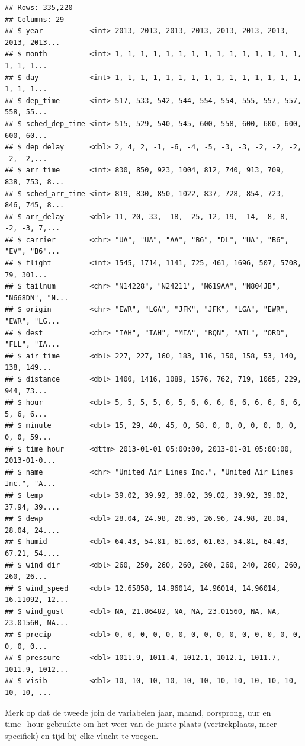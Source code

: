 \documentclass[]{tufte-book}
\begin{document}
\begin{verbatim}
## Rows: 335,220
## Columns: 29
## $ year           <int> 2013, 2013, 2013, 2013, 2013, 2013, 2013, 2013, 2013...
## $ month          <int> 1, 1, 1, 1, 1, 1, 1, 1, 1, 1, 1, 1, 1, 1, 1, 1, 1, 1...
## $ day            <int> 1, 1, 1, 1, 1, 1, 1, 1, 1, 1, 1, 1, 1, 1, 1, 1, 1, 1...
## $ dep_time       <int> 517, 533, 542, 544, 554, 554, 555, 557, 557, 558, 55...
## $ sched_dep_time <int> 515, 529, 540, 545, 600, 558, 600, 600, 600, 600, 60...
## $ dep_delay      <dbl> 2, 4, 2, -1, -6, -4, -5, -3, -3, -2, -2, -2, -2, -2,...
## $ arr_time       <int> 830, 850, 923, 1004, 812, 740, 913, 709, 838, 753, 8...
## $ sched_arr_time <int> 819, 830, 850, 1022, 837, 728, 854, 723, 846, 745, 8...
## $ arr_delay      <dbl> 11, 20, 33, -18, -25, 12, 19, -14, -8, 8, -2, -3, 7,...
## $ carrier        <chr> "UA", "UA", "AA", "B6", "DL", "UA", "B6", "EV", "B6"...
## $ flight         <int> 1545, 1714, 1141, 725, 461, 1696, 507, 5708, 79, 301...
## $ tailnum        <chr> "N14228", "N24211", "N619AA", "N804JB", "N668DN", "N...
## $ origin         <chr> "EWR", "LGA", "JFK", "JFK", "LGA", "EWR", "EWR", "LG...
## $ dest           <chr> "IAH", "IAH", "MIA", "BQN", "ATL", "ORD", "FLL", "IA...
## $ air_time       <dbl> 227, 227, 160, 183, 116, 150, 158, 53, 140, 138, 149...
## $ distance       <dbl> 1400, 1416, 1089, 1576, 762, 719, 1065, 229, 944, 73...
## $ hour           <dbl> 5, 5, 5, 5, 6, 5, 6, 6, 6, 6, 6, 6, 6, 6, 6, 5, 6, 6...
## $ minute         <dbl> 15, 29, 40, 45, 0, 58, 0, 0, 0, 0, 0, 0, 0, 0, 0, 59...
## $ time_hour      <dttm> 2013-01-01 05:00:00, 2013-01-01 05:00:00, 2013-01-0...
## $ name           <chr> "United Air Lines Inc.", "United Air Lines Inc.", "A...
## $ temp           <dbl> 39.02, 39.92, 39.02, 39.02, 39.92, 39.02, 37.94, 39....
## $ dewp           <dbl> 28.04, 24.98, 26.96, 26.96, 24.98, 28.04, 28.04, 24....
## $ humid          <dbl> 64.43, 54.81, 61.63, 61.63, 54.81, 64.43, 67.21, 54....
## $ wind_dir       <dbl> 260, 250, 260, 260, 260, 260, 240, 260, 260, 260, 26...
## $ wind_speed     <dbl> 12.65858, 14.96014, 14.96014, 14.96014, 16.11092, 12...
## $ wind_gust      <dbl> NA, 21.86482, NA, NA, 23.01560, NA, NA, 23.01560, NA...
## $ precip         <dbl> 0, 0, 0, 0, 0, 0, 0, 0, 0, 0, 0, 0, 0, 0, 0, 0, 0, 0...
## $ pressure       <dbl> 1011.9, 1011.4, 1012.1, 1012.1, 1011.7, 1011.9, 1012...
## $ visib          <dbl> 10, 10, 10, 10, 10, 10, 10, 10, 10, 10, 10, 10, 10, ...
\end{verbatim}

Merk op dat de tweede join de variabelen jaar, maand, oorsprong, uur en time\_hour gebruikte om het weer van de juiste plaats (vertrekplaats, meer specifiek) en tijd bij elke vlucht te voegen.
\end{document}
